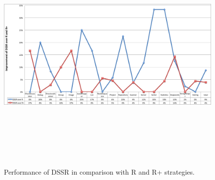 \begin{figure}[h]
	\centering
	\centerline{\includegraphics[width=16cm, height=12cm]{chapter4/DssrImprove.png}}
	\caption{Performance of DSSR in comparison with R and R+ strategies.}
	\label{fig:LineChart}
\end{figure}






